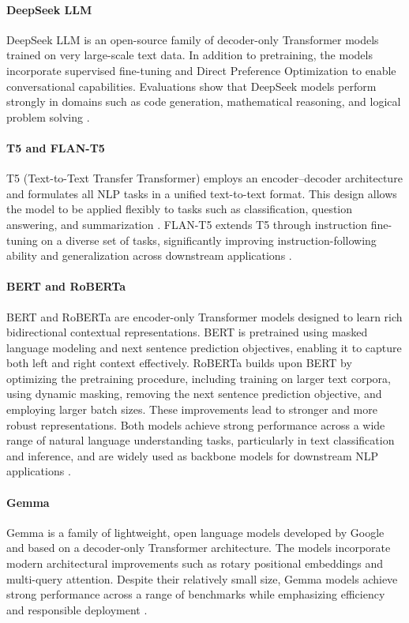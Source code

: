 \paragraph{DeepSeek LLM}
DeepSeek LLM is an open-source family of decoder-only Transformer models trained on very large-scale text data. In addition to pretraining, the models incorporate supervised fine-tuning and Direct Preference Optimization to enable conversational capabilities. Evaluations show that DeepSeek models perform strongly in domains such as code generation, mathematical reasoning, and logical problem solving \cite{deepseekai2024deepseekllmscalingopensource}.

\paragraph{T5 and FLAN-T5}
T5 (Text-to-Text Transfer Transformer) employs an encoder--decoder architecture and formulates all NLP tasks in a unified text-to-text format. This design allows the model to be applied flexibly to tasks such as classification, question answering, and summarization \cite{raffel2023exploringlimitstransferlearning}.  
FLAN-T5 extends T5 through instruction fine-tuning on a diverse set of tasks, significantly improving instruction-following ability and generalization across downstream applications \cite{chung2022scalinginstructionfinetunedlanguagemodels}.

\paragraph{BERT and RoBERTa}
BERT and RoBERTa are encoder-only Transformer models designed to learn rich bidirectional contextual representations. BERT is pretrained using masked language modeling and next sentence prediction objectives, enabling it to capture both left and right context effectively. RoBERTa builds upon BERT by optimizing the pretraining procedure, including training on larger text corpora, using dynamic masking, removing the next sentence prediction objective, and employing larger batch sizes. These improvements lead to stronger and more robust representations. Both models achieve strong performance across a wide range of natural language understanding tasks, particularly in text classification and inference, and are widely used as backbone models for downstream NLP applications \cite{devlin2019bertpretrainingdeepbidirectional, liu2019robertarobustlyoptimizedbert}.


\paragraph{Gemma}
Gemma is a family of lightweight, open language models developed by Google and based on a decoder-only Transformer architecture. The models incorporate modern architectural improvements such as rotary positional embeddings and multi-query attention. Despite their relatively small size, Gemma models achieve strong performance across a range of benchmarks while emphasizing efficiency and responsible deployment \cite{gemmateam2024gemmaopenmodelsbased}.

